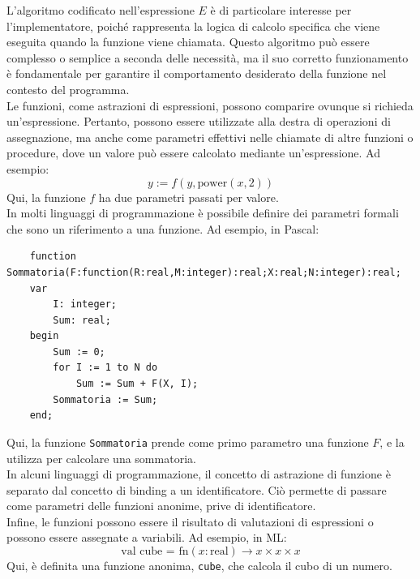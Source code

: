 \documentclass{article}
\begin{document}
	L'algoritmo codificato nell'espressione $E$ è di particolare interesse per l'implementatore, poiché rappresenta la logica di calcolo specifica che viene eseguita quando la funzione viene chiamata. Questo algoritmo può essere complesso o semplice a seconda delle necessità, ma il suo corretto funzionamento è fondamentale per garantire il comportamento desiderato della funzione nel contesto del programma.
	\vspace{\baselineskip} \\
	Le funzioni, come astrazioni di espressioni, possono comparire ovunque si richieda un'espressione. Pertanto, possono essere utilizzate alla destra di operazioni di assegnazione, ma anche come parametri effettivi nelle chiamate di altre funzioni o procedure, dove un valore può essere calcolato mediante un'espressione. Ad esempio:
	\[
	y := f(y, \text{{power}}(x,2))
	\]
	Qui, la funzione \( f \) ha due parametri passati per valore.
	\vspace{\baselineskip} \\
	In molti linguaggi di programmazione è possibile definire dei parametri formali che sono un riferimento a una funzione. Ad esempio, in Pascal:
	\begin{verbatim}
	function Sommatoria(F:function(R:real,M:integer):real;X:real;N:integer):real;
	var
		I: integer;
		Sum: real;
	begin
		Sum := 0;
		for I := 1 to N do
			Sum := Sum + F(X, I);
		Sommatoria := Sum;
	end;
	\end{verbatim}
	Qui, la funzione \texttt{Sommatoria} prende come primo parametro una funzione \( F \), e la utilizza per calcolare una sommatoria.
	\vspace{\baselineskip} \\
	In alcuni linguaggi di programmazione, il concetto di astrazione di funzione è separato dal concetto di binding a un identificatore. Ciò permette di passare come parametri delle funzioni anonime, prive di identificatore.
	\vspace{\baselineskip} \\
	Infine, le funzioni possono essere il risultato di valutazioni di espressioni o possono essere assegnate a variabili. Ad esempio, in ML:
	\[
	\text{{val cube = fn}} (x: \text{{real}}) \rightarrow x \times x \times x
	\]
	Qui, è definita una funzione anonima, \texttt{cube}, che calcola il cubo di un numero.
	\vspace{\baselineskip} \\
\end{document}
